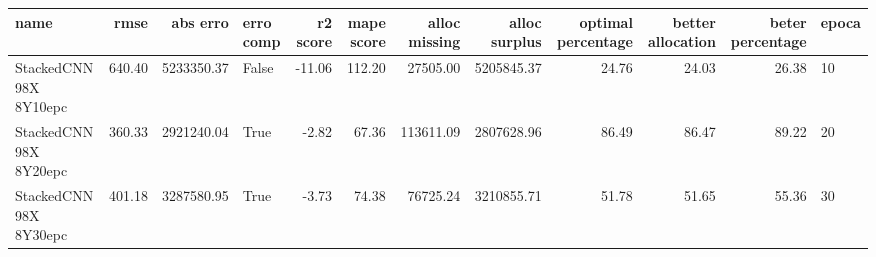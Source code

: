 \begin{tabular}{lrrlrrrrrrrl}
\toprule
name & rmse & abs erro & erro comp & r2 score & mape score & alloc missing & alloc surplus & optimal percentage & better allocation & beter percentage & epoca \\
\midrule
StackedCNN 98X 8Y10epc & 640.40 & 5233350.37 & False & -11.06 & 112.20 & 27505.00 & 5205845.37 & 24.76 & 24.03 & 26.38 & 10 \\
StackedCNN 98X 8Y20epc & 360.33 & 2921240.04 & True & -2.82 & 67.36 & 113611.09 & 2807628.96 & 86.49 & 86.47 & 89.22 & 20 \\
StackedCNN 98X 8Y30epc & 401.18 & 3287580.95 & True & -3.73 & 74.38 & 76725.24 & 3210855.71 & 51.78 & 51.65 & 55.36 & 30 \\
\bottomrule
\end{tabular}
